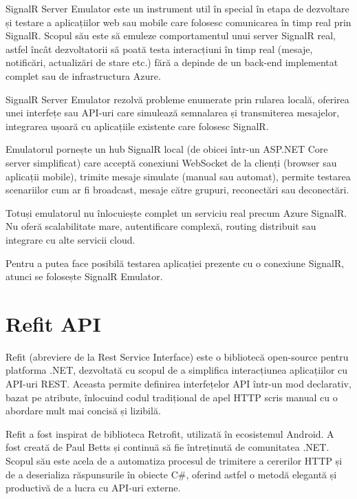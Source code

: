 SignalR Server Emulator este un instrument util în special în etapa de dezvoltare și testare a aplicațiilor web sau mobile care folosesc comunicarea în timp real prin SignalR. Scopul său este să emuleze comportamentul unui server SignalR real, astfel încât dezvoltatorii să poată testa interacțiuni în timp real (mesaje, notificări, actualizări de stare etc.) fără a depinde de un back-end implementat complet sau de infrastructura Azure. \parencite{signalREmulator}

SignalR Server Emulator rezolvă probleme enumerate prin rularea locală, oferirea unei interfețe sau API-uri care simulează semnalarea și transmiterea mesajelor, integrarea ușoară cu aplicațiile existente care folosesc SignalR. \parencite{signalREmulator}

Emulatorul pornește un hub SignalR local (de obicei într-un ASP.NET Core server simplificat) care acceptă conexiuni WebSocket de la clienți (browser sau aplicații mobile), trimite mesaje simulate (manual sau automat), permite testarea scenariilor cum ar fi broadcast, mesaje către grupuri, reconectări sau deconectări. \parencite{signalREmulator}

Totuși emulatorul nu înlocuiește complet un serviciu real precum Azure SignalR. Nu oferă scalabilitate mare, autentificare complexă, routing distribuit sau integrare cu alte servicii cloud. \parencite{signalREmulator}

Pentru a putea face posibilă testarea aplicației prezente cu o conexiune SignalR, atunci se folosește SignalR Emulator.

\section{Refit API}

Refit (abreviere de la Rest Service Interface) este o bibliotecă open-source pentru platforma .NET, dezvoltată cu scopul de a simplifica interacțiunea aplicațiilor cu API-uri REST. Aceasta permite definirea interfețelor API într-un mod declarativ, bazat pe atribute, înlocuind codul tradițional de apel HTTP scris manual cu o abordare mult mai concisă și lizibilă. \parencite{refit}

Refit a fost inspirat de biblioteca Retrofit, utilizată în ecosistemul Android. A fost creată de Paul Betts și continuă să fie întreținută de comunitatea .NET. Scopul său este acela de a automatiza procesul de trimitere a cererilor HTTP și de a deserializa răspunsurile în obiecte C\#, oferind astfel o metodă elegantă și productivă de a lucra cu API-uri externe. \parencite{refit}

